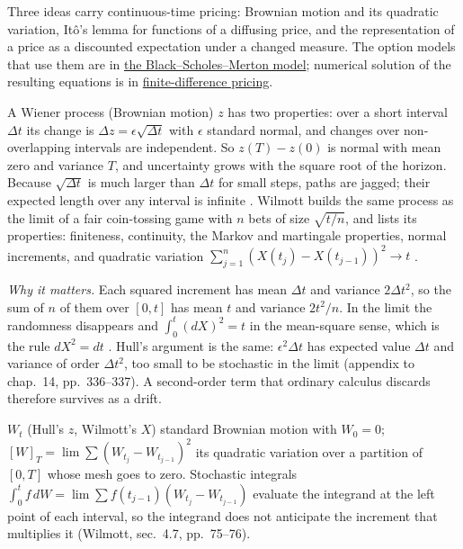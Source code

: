Three ideas carry continuous-time pricing: Brownian motion and its quadratic variation, It\^o's lemma for functions of a diffusing price, and the representation of a price as a discounted expectation under a changed measure. The option models that use them are in \hyperref[mod:black-scholes-merton]{the Black--Scholes--Merton model}; numerical solution of the resulting equations is in \hyperref[meth:finite-difference-option-pricing]{finite-difference pricing}.

\begin{qfdefinition}[Brownian motion and quadratic variation: independent Gaussian increments, quadratic variation equal to elapsed time, and why $(dW)^2=dt$ produces It\^o's correction]\label{def:brownian-motion-quadratic-variation}
 A Wiener process (Brownian motion) $z$ has two properties: over a short interval $\Delta t$ its change is $\Delta z=\epsilon\sqrt{\Delta t}$ with $\epsilon$ standard normal, and changes over non-overlapping intervals are independent. So $z(T)-z(0)$ is normal with mean zero and variance $T$, and uncertainty grows with the square root of the horizon. Because $\sqrt{\Delta t}$ is much larger than $\Delta t$ for small steps, paths are jagged; their expected length over any interval is infinite \citep[chap.~14, sec.~14.2, pp.~318--319]{s7-hulloptions}. Wilmott builds the same process as the limit of a fair coin-tossing game with $n$ bets of size $\sqrt{t/n}$, and lists its properties: finiteness, continuity, the Markov and martingale properties, normal increments, and quadratic variation $\sum_{j=1}^n(X(t_j)-X(t_{j-1}))^2\to t$ \citep[chap.~4, secs.~4.5--4.6, pp.~73--75]{wide-wilmott-pwoqf}.

\emph{Why it matters.} Each squared increment has mean $\Delta t$ and variance $2\Delta t^2$, so the sum of $n$ of them over $[0,t]$ has mean $t$ and variance $2t^2/n$. In the limit the randomness disappears and $\int_0^t(dX)^2=t$ in the mean-square sense, which is the rule $dX^2=dt$ \citep[secs.~4.9 and~4.12.1, pp.~77--78 and~82--83]{wide-wilmott-pwoqf}. Hull's argument is the same: $\epsilon^2\Delta t$ has expected value $\Delta t$ and variance of order $\Delta t^2$, too small to be stochastic in the limit (appendix to chap.~14, pp.~336--337). A second-order term that ordinary calculus discards therefore survives as a drift.

 $W_t$ (Hull's $z$, Wilmott's $X$) standard Brownian motion with $W_0=0$; $[W]_T=\lim\sum(W_{t_j}-W_{t_{j-1}})^2$ its quadratic variation over a partition of $[0,T]$ whose mesh goes to zero. Stochastic integrals $\int_0^tf\,dW=\lim\sum f(t_{j-1})(W_{t_j}-W_{t_{j-1}})$ evaluate the integrand at the left point of each interval, so the integrand does not anticipate the increment that multiplies it (Wilmott, sec.~4.7, pp.~75--76).


\end{qfdefinition}
